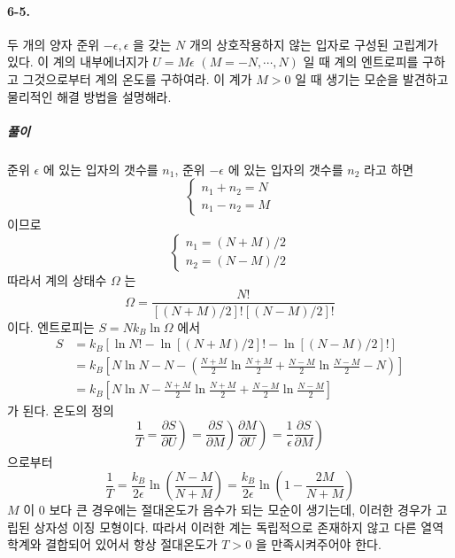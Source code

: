 \documentclass[a4paper,12pt]{report}
\newcommand{\Maxwell}[3][]{\left.\frac{\partial #2}{\partial #3} \right)_{#1} }
\begin{document}
	\paragraph{6-5. } 두 개의 양자 준위 $-\epsilon,\epsilon$ 을 갖는 $N$ 개의 상호작용하지 않는 입자로 구성된 고립계가 있다. 이 계의 내부에너지가 $U=M\epsilon$ $(M=-N,\cdots,N)$ 일 때 계의 엔트로피를 구하고 그것으로부터 계의 온도를 구하여라. 이 계가 $M>0$ 일 때 생기는 모순을 발견하고 물리적인 해결 방법을 설명해라.
	\subparagraph{풀이} 준위 $\epsilon$ 에 있는 입자의 갯수를 $n_1$, 준위 $-\epsilon$ 에 있는 입자의 갯수를 $n_2$ 라고 하면
	$$\begin{cases}
	n_1+n_2=N\\
	n_1-n_2=M
	\end{cases}$$
	이므로
	$$\begin{cases}
	n_1=(N+M)/2\\n_2=(N-M)/2
	\end{cases}$$
	따라서 계의 상태수 $\Omega$ 는 
	$$\Omega=\frac{N!}{[(N+M)/2]![(N-M)/2]!}$$
	이다. 엔트로피는 $S=Nk_B\ln \Omega$ 에서
	\begin{equation*}
		\begin{split}
			S&=k_B[\ln N!-\ln[(N+M)/2]!-\ln[(N-M)/2]!]\\
			&=k_B\left[N\ln N-N-\left(\frac{N+M}{2}\ln\frac{N+M}{2}+\frac{N-M}{2}\ln\frac{N-M}{2}-N \right) \right]\\
			&=k_B\left[N\ln N-\frac{N+M}{2}\ln\frac{N+M}{2}+\frac{N-M}{2}\ln\frac{N-M}{2}\right]
		\end{split}
	\end{equation*}
	가 된다. 온도의 정의
	$$\frac{1}{T}=\Maxwell[]{S}{U}=\Maxwell{S}{M}\Maxwell{M}{U}=\frac{1}{\epsilon}\Maxwell{S}{M}$$으로부터
	$$\frac{1}{T}=\frac{k_B}{2\epsilon}\ln\left(\frac{N-M}{N+M} \right)=\frac{k_B}{2\epsilon}\ln\left(1-\frac{2M}{N+M} \right)  $$ 
	$M$ 이 $0$ 보다 큰 경우에는 절대온도가 음수가 되는 모순이 생기는데, 이러한 경우가 고립된 상자성 이징 모형이다. 따라서 이러한 계는 독립적으로 존재하지 않고 다른 열역학계와 결합되어 있어서 항상 절대온도가 $T>0$ 을 만족시켜주어야 한다. 
\end{document}
